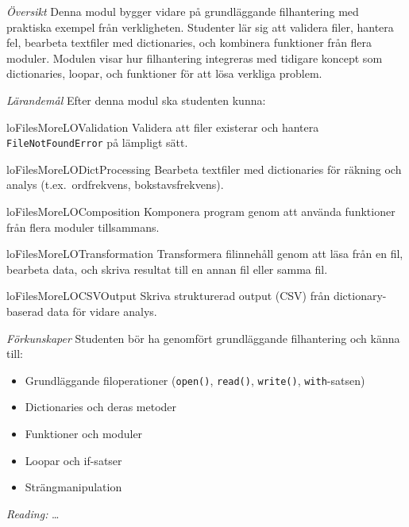\emph{Översikt}
Denna modul bygger vidare på grundläggande filhantering med praktiska exempel
från verkligheten.
Studenter lär sig att validera filer, hantera fel, bearbeta textfiler med
dictionaries, och kombinera funktioner från flera moduler.
Modulen visar hur filhantering integreras med tidigare koncept som dictionaries,
loopar, och funktioner för att lösa verkliga problem.

\emph{Lärandemål}
Efter denna modul ska studenten kunna:
\begin{restatable}{lo}{FilesMoreLOValidation}\label{FilesMoreLOValidation}%
  Validera att filer existerar och hantera \texttt{FileNotFoundError}
  på lämpligt sätt.
\end{restatable}
\begin{restatable}{lo}{FilesMoreLODictProcessing}\label{FilesMoreLODictProcessing}%
  Bearbeta textfiler med dictionaries för räkning och analys
  (t.ex.\ ordfrekvens, bokstavsfrekvens).
\end{restatable}
\begin{restatable}{lo}{FilesMoreLOComposition}\label{FilesMoreLOComposition}%
  Komponera program genom att använda funktioner från flera moduler
  tillsammans.
\end{restatable}
\begin{restatable}{lo}{FilesMoreLOTransformation}\label{FilesMoreLOTransformation}%
  Transformera filinnehåll genom att läsa från en fil, bearbeta data,
  och skriva resultat till en annan fil eller samma fil.
\end{restatable}
\begin{restatable}{lo}{FilesMoreLOCSVOutput}\label{FilesMoreLOCSVOutput}%
  Skriva strukturerad output (CSV) från dictionary-baserad data för
  vidare analys.
\end{restatable}

\emph{Förkunskaper}
Studenten bör ha genomfört grundläggande filhantering och känna till:
\begin{itemize}
  \item Grundläggande filoperationer (\texttt{open()},
    \texttt{read()}, \texttt{write()},
    \texttt{with}-satsen)
  \item Dictionaries och deras metoder
  \item Funktioner och moduler
  \item Loopar och if-satser
  \item Strängmanipulation
\end{itemize}

\emph{Reading:}
\dots
